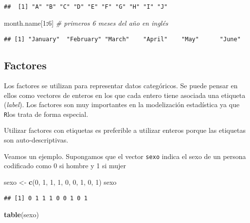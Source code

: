 \documentclass[]{book}
\newenvironment{Shaded}{\begin{snugshade}}{\end{snugshade}}
\newcommand{\KeywordTok}[1]{\textcolor[rgb]{0.13,0.29,0.53}{\textbf{#1}}}
\newcommand{\DecValTok}[1]{\textcolor[rgb]{0.00,0.00,0.81}{#1}}
\newcommand{\StringTok}[1]{\textcolor[rgb]{0.31,0.60,0.02}{#1}}
\newcommand{\CommentTok}[1]{\textcolor[rgb]{0.56,0.35,0.01}{\textit{#1}}}
\newcommand{\OperatorTok}[1]{\textcolor[rgb]{0.81,0.36,0.00}{\textbf{#1}}}
\newcommand{\NormalTok}[1]{#1}
\begin{document}
\begin{verbatim}
##  [1] "A" "B" "C" "D" "E" "F" "G" "H" "I" "J"
\end{verbatim}

\begin{Shaded}
\begin{Highlighting}[]
\NormalTok{month.name[}\DecValTok{1}\OperatorTok{:}\DecValTok{6}\NormalTok{]  }\CommentTok{# primeros 6 meses del año en inglés}
\end{Highlighting}
\end{Shaded}

\begin{verbatim}
## [1] "January"  "February" "March"    "April"    "May"      "June"
\end{verbatim}

\subsection{Factores}\label{factores}

Los factores se utilizan para representar datos categóricos. Se puede
pensar en ellos como vectores de enteros en los que cada entero tiene
asociada una etiqueta (\emph{label}). Los factores son muy importantes
en la modelización estadística ya que \texttt{R}los trata de forma
especial.

Utilizar factores con etiquetas es preferible a utilizar enteros porque
las etiquetas son auto-descriptivas.

Veamos un ejemplo. Supongamos que el vector \texttt{sexo} indica el sexo
de un persona codificado como 0 si hombre y 1 si mujer

\begin{Shaded}
\begin{Highlighting}[]
\NormalTok{sexo <-}\StringTok{ }\KeywordTok{c}\NormalTok{(}\DecValTok{0}\NormalTok{, }\DecValTok{1}\NormalTok{, }\DecValTok{1}\NormalTok{, }\DecValTok{1}\NormalTok{, }\DecValTok{0}\NormalTok{, }\DecValTok{0}\NormalTok{, }\DecValTok{1}\NormalTok{, }\DecValTok{0}\NormalTok{, }\DecValTok{1}\NormalTok{)}
\NormalTok{sexo}
\end{Highlighting}
\end{Shaded}

\begin{verbatim}
## [1] 0 1 1 1 0 0 1 0 1
\end{verbatim}

\begin{Shaded}
\begin{Highlighting}[]
\KeywordTok{table}\NormalTok{(sexo)}
\end{Highlighting}
\end{Shaded}
\end{document}
